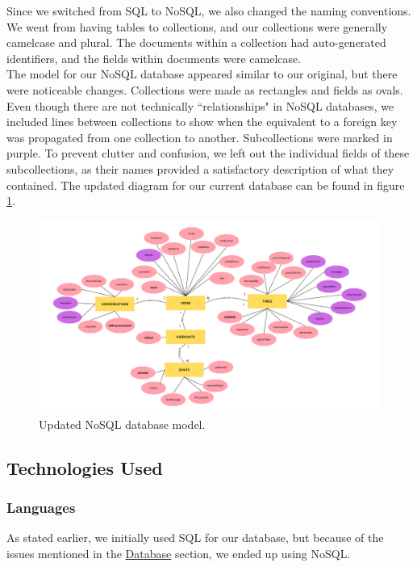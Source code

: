 \noindent Since we switched from SQL to NoSQL, we also changed the naming conventions. We went from having tables to collections, and our collections were generally camelcase and plural. The documents within a collection had auto-generated identifiers, and the fields within documents were camelcase.\\

\noindent The model for our NoSQL database appeared similar to our original, but there were noticeable changes. Collections were made as rectangles and fields as ovals. Even though there are not technically ``relationships" in NoSQL databases, we included lines between collections to show when the equivalent to a foreign key was propagated from one collection to another. Subcollections were marked in purple. To prevent clutter and confusion, we left out the individual fields of these subcollections, as their names provided a satisfactory description of what they contained. The updated diagram for our current database can be found in figure \ref{fig:NoSQL_Model}.

\begin{figure}[hbt!]
    \centering
    \includegraphics[width=1.0\linewidth]{figures/NoSQL_Database_Model.png}
    \caption{Updated NoSQL database model.}
    \label{fig:NoSQL_Model}
\end{figure}


\pagebreak

\subsection{Technologies Used}

\subsubsection{Languages}
\noindent As stated earlier, we initially used SQL for our database, but because of the issues mentioned in the \hyperref[sec:database]{Database} section, we ended up using NoSQL. \\


